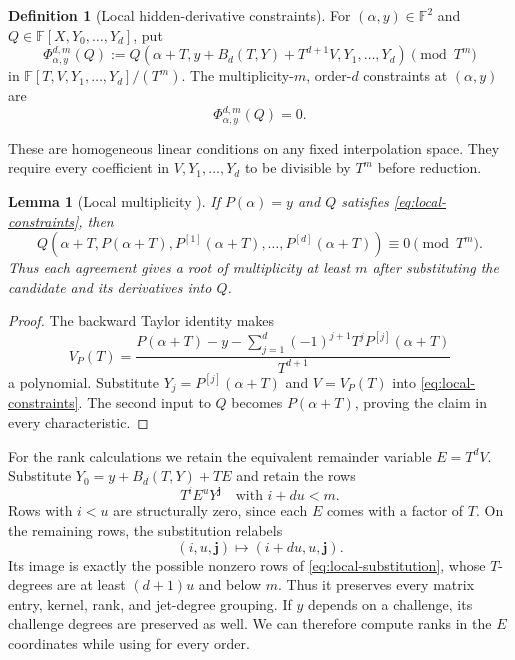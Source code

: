 \documentclass[11pt,letterpaper]{article}
\newtheorem{lemma}[lemma]{Lemma}
\theoremstyle{definition}
\newtheorem{definition}[definition]{Definition}
\newcommand{\F}{\mathbb{F}}
\begin{document}
\begin{definition}[Local hidden-derivative constraints]
\label{def:local-constraints}
For $(\alpha,y)\in\F^2$ and $Q\in\F[X,Y_0,\ldots,Y_d]$, put
\begin{equation}
 \Phi_{\alpha,y}^{d,m}(Q):=
 Q(\alpha+T,y+B_d(T,Y)+T^{d+1}V,Y_1,\ldots,Y_d)\pmod{T^m}
 \label{eq:local-substitution}
\end{equation}
in $\F[T,V,Y_1,\ldots,Y_d]/(T^m)$. The multiplicity-$m$, order-$d$
constraints at $(\alpha,y)$ are
\begin{equation}
 \Phi_{\alpha,y}^{d,m}(Q)=0.
 \label{eq:local-constraints}
\end{equation}
\end{definition}
These are homogeneous linear conditions on any fixed interpolation space.
They require every coefficient in $V,Y_1,\ldots,Y_d$ to be divisible by
$T^m$ before reduction.

\begin{lemma}[Local multiplicity {\cite[Lemma~3.1]{BCPZZ26}}]
\label{lem:local-multiplicity}
If $P(\alpha)=y$ and $Q$ satisfies \eqref{eq:local-constraints}, then
\begin{equation}
 Q(\alpha+T,P(\alpha+T),P^{[1]}(\alpha+T),\ldots,P^{[d]}(\alpha+T))
 \equiv0\pmod{T^m}.
 \label{eq:local-multiplicity-conclusion}
\end{equation}
Thus each agreement gives a root of multiplicity at least $m$ after
substituting the candidate and its derivatives into $Q$.
\end{lemma}
\begin{proof}
The backward Taylor identity makes
\begin{equation}
 V_P(T)=\frac{P(\alpha+T)-y-
 \sum_{j=1}^d(-1)^{j+1}T^jP^{[j]}(\alpha+T)}{T^{d+1}}
 \label{eq:local-remainder}
\end{equation}
a polynomial. Substitute $Y_j=P^{[j]}(\alpha+T)$ and $V=V_P(T)$
into \eqref{eq:local-constraints}. The second input to $Q$ becomes
$P(\alpha+T)$, proving the claim in every characteristic.
\end{proof}

For the rank calculations we retain the equivalent remainder variable
$E=T^dV$. Substitute $Y_0=y+B_d(T,Y)+TE$ and retain the rows
\begin{equation}
 T^iE^uY^{\mathbf j}\quad\text{with }i+du<m.
 \label{eq:local-e-row-cutoff}
\end{equation}
Rows with $i<u$ are structurally zero, since each $E$ comes with a factor
of $T$. On the remaining rows, the substitution relabels
\begin{equation}
 (i,u,\mathbf j)\longmapsto(i+du,u,\mathbf j).
 \label{eq:local-row-relabeling}
\end{equation}
Its image is exactly the possible nonzero rows of
\eqref{eq:local-substitution}, whose $T$-degrees are at least $(d+1)u$
and below $m$. Thus it preserves every matrix entry, kernel, rank, and
jet-degree grouping. If $y$ depends on a challenge, its challenge degrees
are preserved as well. We can therefore compute ranks in the $E$
coordinates while using  for every order.
\end{document}
